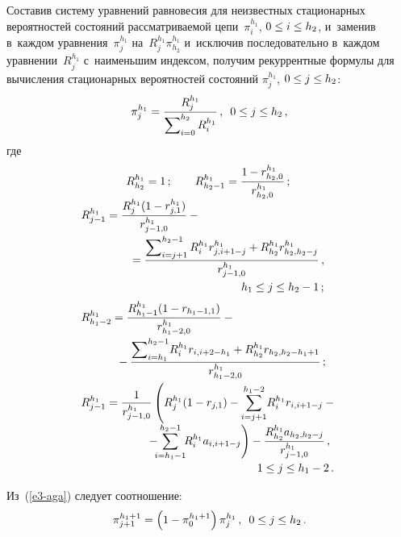 \begin{multicols}{2}
Составив сис\-те\-му уравнений равновесия для неизвестных стационарных 
вероятностей со\-сто\-яний
 рас\-смат\-ри\-ва\-емой цепи~$\pi_i^{h_1}$, $0\hm\leq 
i\hm\leq h_2$, и~заменив в~каждом уравнения~$\pi_j^{h_1}$ 
на~$R_j^{h_1}\pi_{h_2}^{h_1}$ и~исключив последовательно в~каж\-дом 
уравнении~$R_j^{h_1}$ с~наименьшим индексом, получим рекуррентные 
формулы для вы\-чис\-ле\-ния стационарных вероятностей состояний 
$\pi_j^{h_1}$, $0\hm\leq j\hm\leq h_2$:
  \begin{equation}
  \pi_j^{h_1}=\displaystyle\frac{\displaystyle R_j^{h_1}\mathstrut}{\displaystyle \sum\nolimits_{i=0}^{h_2} R_i^{h_1}\mathstrut}\,,\enskip 
0\leq j\leq h_2\,,
\label{e3-aga}
  \end{equation}
где
\begin{equation*}
\begin{array}{l}
\qquad \qquad R_{h_2}^{h_1} =1\,;\qquad R^{h_1}_{h_2-1} =\fr{1-r^{h_1}_{h_2,0}}{r^{h_1}_{h_2,0}}\,;\\[6pt]
R^{h_1}_{j-1} =\fr{R_j^{h_1}(1-r^{h_1}_{j,1})}{r^{h_1}_{j-1,0}}-{}\\[12pt]
\hspace*{15mm}{}= 
\fr{\sum\nolimits^{h_2-1}_{i=j+1} R_i^{h_1} r^{h_1}_{j,i+1-j} +R^{h_1}_{h_2} r^{h_1}_{h_2,h_2-j}} {r^{h_1}_{j-1,0}}\,,\\[12pt]
 \hspace*{50mm}h_1\leq j\leq h_2-1\,;\\[6pt]
  R^{h_1}_{h_1-2} = \fr{R^{h_1}_{h_1-1} (1-r_{h_1-1,1})}{r^{h_1}_{h_1-2,0}} - {}\\[12pt]
\hspace*{11mm}{}-\fr{\sum\nolimits_{i=h_1}^{h_2-1} \! R_i^{h_1} r_{i,i+2-h_1} +R^{h_1}_{h_2} r_{h_2, h_2-h_1+1}} {r^{h_1}_{h_1-2,0}}\,;\\[12pt]
  R^{h_1}_{j-1} =\fr{1}{r^{h_1}_{j-1,0}} \left(
   \displaystyle R_j^{h_1}(1-r_{j,1}) - \sum\limits^{h_1-2}_{i=j+1} \! R_i^{h_1} r_{i,i+1-j} - {}\right.\\[12pt]
\hspace*{20mm}\left.  \displaystyle {}-\!\!\!\sum\limits^{h_2-1}_{i=h_1-1}\!\! R_i^{h_1} a_{i,i+1-j}\right)%
- \fr{R^{h_1}_{h_2} a_{h_2, h_2-j}}{r^{h_1}_{j-1,0}}\,,\\[12pt]
 \hspace{55mm}1\leq j\leq h_1-2\,.
   \end{array}
   \end{equation*}
  
  Из~(\ref{e3-aga}) следует соотношение:
  \begin{equation}
  \pi^{h_1+1}_{j+1} =\left( 1-\pi_0^{h_1+1}\right) \pi_j^{h_1}\,,\enskip 0\leq j\leq 
h_2\,.
  \label{e4-aga}
  \end{equation}
  

\end{multicols}
